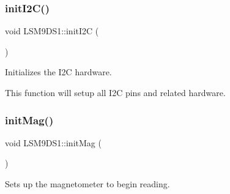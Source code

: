 \subsubsection{\texorpdfstring{init\+I2\+C()}{initI2C()}}
{\footnotesize\ttfamily void L\+S\+M9\+D\+S1\+::init\+I2C (\begin{DoxyParamCaption}{ }\end{DoxyParamCaption})\hspace{0.3cm}{\ttfamily [protected]}}



Initializes the I2C hardware. 

This function will setup all I2C pins and related hardware. \mbox{\label{classLSM9DS1_a492aa6edcf891f273d932636e3cc470d}} 
\subsubsection{\texorpdfstring{init\+Mag()}{initMag()}}
{\footnotesize\ttfamily void L\+S\+M9\+D\+S1\+::init\+Mag (\begin{DoxyParamCaption}{ }\end{DoxyParamCaption})\hspace{0.3cm}{\ttfamily [protected]}}



Sets up the magnetometer to begin reading. 

